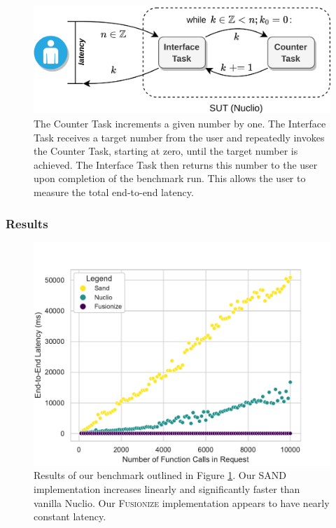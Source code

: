 \begin{figure}
    \centering
    \includegraphics[width=\linewidth]{figures/bench}
    \caption{
        The Counter Task increments a given number by one. The Interface Task
        receives a target number from the user and repeatedly invokes the
        Counter Task, starting at zero, until the target number is achieved. The
        Interface Task then returns this number to the user upon completion of
        the benchmark run. This allows the user to measure the total end-to-end
        latency.
    }
    \label{fig:bench}
\end{figure}

\subsubsection{Results}
\label{subsubsec:evaluation:fusionize_and_sand:results}

\begin{figure}
    \centering
    \includegraphics[width=\linewidth]{figures/latency_sand_fusionize}
    \caption{
        Results of our benchmark outlined in Figure \ref{fig:bench}. Our SAND
        implementation increases linearly and significantly faster than vanilla
        Nuclio. Our \textsc{Fusionize} implementation appears to have nearly
        constant latency.
    }
    \label{fig:latency_sand_fusionize}
\end{figure}


